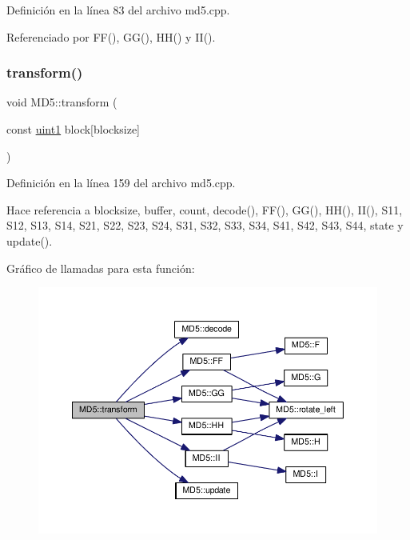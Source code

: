 Definición en la línea 83 del archivo md5.\+cpp.



Referenciado por F\+F(), G\+G(), H\+H() y I\+I().

\hypertarget{classMD5_a9d569ab2a3e564793e116f774a3ad269}{}\label{classMD5_a9d569ab2a3e564793e116f774a3ad269} 
\subsubsection{\texorpdfstring{transform()}{transform()}}
{\footnotesize\ttfamily void M\+D5\+::transform (\begin{DoxyParamCaption}\item[{const \hyperlink{classMD5_a3b1c4901139aef256ee49c4ab14d09f9}{uint1}}]{block\mbox{[}blocksize\mbox{]} }\end{DoxyParamCaption})\hspace{0.3cm}{\ttfamily [private]}}



Definición en la línea 159 del archivo md5.\+cpp.



Hace referencia a blocksize, buffer, count, decode(), F\+F(), G\+G(), H\+H(), I\+I(), S11, S12, S13, S14, S21, S22, S23, S24, S31, S32, S33, S34, S41, S42, S43, S44, state y update().

Gráfico de llamadas para esta función\+:\nopagebreak
\begin{figure}[H]
\begin{center}
\leavevmode
\includegraphics[width=350pt]{classMD5_a9d569ab2a3e564793e116f774a3ad269_cgraph}
\end{center}
\end{figure}
\hypertarget{classMD5_ac5ddf6cd8f940422396d321ea90ed045}{}\label{classMD5_ac5ddf6cd8f940422396d321ea90ed045} 
